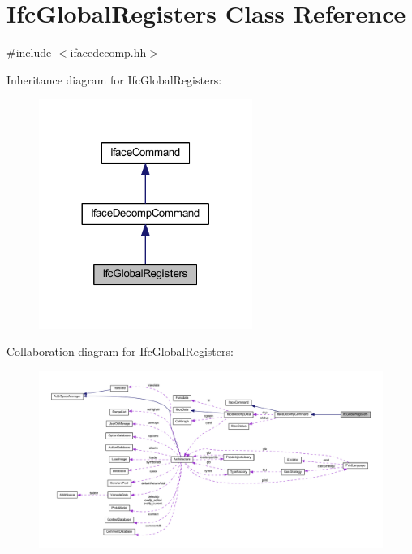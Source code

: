 \hypertarget{class_ifc_global_registers}{}\section{Ifc\+Global\+Registers Class Reference}
\label{class_ifc_global_registers}


{\ttfamily \#include $<$ifacedecomp.\+hh$>$}



Inheritance diagram for Ifc\+Global\+Registers\+:
\nopagebreak
\begin{figure}[H]
\begin{center}
\leavevmode
\includegraphics[width=197pt]{class_ifc_global_registers__inherit__graph}
\end{center}
\end{figure}


Collaboration diagram for Ifc\+Global\+Registers\+:
\nopagebreak
\begin{figure}[H]
\begin{center}
\leavevmode
\includegraphics[width=350pt]{class_ifc_global_registers__coll__graph}
\end{center}
\end{figure}

